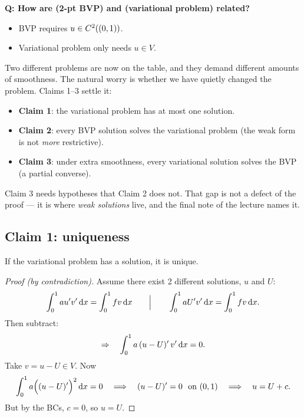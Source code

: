 \medskip
\noindent\textbf{Q: How are (2-pt BVP) and (variational problem) related?}
\begin{itemize}[leftmargin=1.6em,itemsep=1pt]
  \item BVP requires $u\in\Ck[(0,1)]{2}$.
  \item Variational problem only needs $u\in V$.
\end{itemize}

\begin{intuition}
Two different problems are now on the table, and they demand different amounts
of smoothness. The natural worry is whether we have quietly changed the
problem. Claims 1--3 settle it:
\begin{itemize}[leftmargin=1.4em,itemsep=2pt]
  \item \textbf{Claim 1}: the variational problem has at most one solution.
  \item \textbf{Claim 2}: every BVP solution solves the variational problem
        (the weak form is not \emph{more} restrictive).
  \item \textbf{Claim 3}: under extra smoothness, every variational solution
        solves the BVP (a partial converse).
\end{itemize}
Claim 3 needs hypotheses that Claim 2 does not. That gap is not a defect of the
proof --- it is where \emph{weak solutions} live, and the final note of the
lecture names it.
\end{intuition}

\subsection*{Claim 1: uniqueness}

\begin{proposition}
If the variational problem has a solution, it is unique.
\end{proposition}

\begin{proof}[Proof (by contradiction)]
Assume there exist 2 different solutions, $u$ and $U$:
\[
  \int_{0}^{1} a u'v'\dx = \int_{0}^{1} fv\dx
  \qquad\Big|\qquad
  \int_{0}^{1} a U'v'\dx = \int_{0}^{1} fv\dx .
\]
Then subtract:
\begin{equation}
  \Rightarrow\quad \int_{0}^{1} a\,(u-U)'\,v'\dx = 0 .
\end{equation}
Take $v = u-U \in V$. Now
\begin{equation}\label{eq:zeroenergy}
  \int_{0}^{1} a\Bigl((u-U)'\Bigr)^{2}\dx = 0
  \quad\Longrightarrow\quad (u-U)' = 0 \ \text{ on } (0,1)
  \quad\Longrightarrow\quad u = U + c .
\end{equation}
But by the BCs, $c=0$, so $u=U$.
\end{proof}

